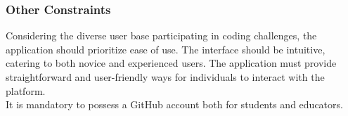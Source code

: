\subsubsection{Other Constraints}
Considering the diverse user base participating in coding challenges, the \app application should prioritize ease of use. The interface should be intuitive, catering to both novice and experienced users. The application must provide straightforward and user-friendly ways for individuals to interact with the platform. \\
It is mandatory to possess a GitHub account both for students and educators.
